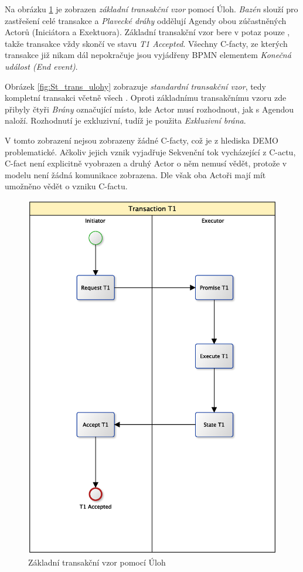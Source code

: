 \documentclass[]{article}
\begin{document}
Na obrázku \ref{fig:Zk_trans_ulohy} je zobrazen \textit{základní transakční vzor} pomocí Úloh. \textit{Bazén} slouží pro zastřešení celé transakce a \textit{Plavecké dráhy} oddělují Agendy obou zúčastněných Actorů (Iniciátora a Exektuora). Základní transakční vzor bere v potaz pouze , takže transakce vždy skončí ve stavu \textit{T1 Accepted}. Všechny C-facty, ze kterých transakce již nikam dál nepokračuje jsou vyjádřeny BPMN elementem \textit{Konečná událost (End event)}.

Obrázek \ref{fig:St_trans_ulohy} zobrazuje \textit{standardní transakční vzor}, tedy kompletní transakci včetně všech . Oproti základnímu transakčnímu vzoru zde přibyly čtyři \textit{Brány} označující místo, kde Actor musí rozhodnout, jak s Agendou naloží. Rozhodnutí je exkluzivní, tudíž je použita \textit{Exkluzivní brána}.

V tomto zobrazení nejsou zobrazeny žádné C-facty, což je z hlediska DEMO problematické. Ačkoliv jejich vznik vyjadřuje Sekvenční tok vycházející z C-actu, C-fact není explicitně vyobrazen a druhý Actor o něm nemusí vědět, protože v modelu není žádná komunikace zobrazena. Dle \cite{Dietz2006} však oba Actoři mají mít umožněno vědět o vzniku C-factu.

\begin{figure}[H]\centering
\includegraphics[width=1.0\textwidth]{obrazky/transaction-basic-tasks}
\caption{Základní transakční vzor pomocí Úloh}
\label{fig:Zk_trans_ulohy}
\end{figure}
\end{document}
